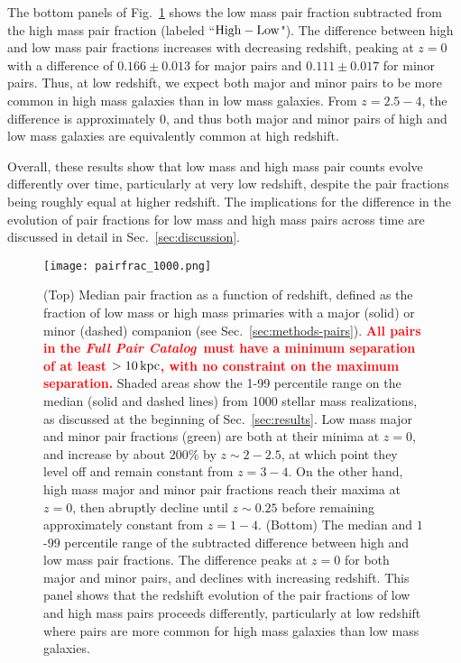 \documentclass[linenumbers,twocolumn]{aastex631}
\newcommand{\add}[1]{\textcolor{red}{\textbf{#1}}}
\newcommand{\paircat}{\textit{Full Pair Catalog}}
\begin{document}
    The bottom panels of Fig.~\ref{fig:pairfrac} shows the low mass pair fraction subtracted from the high mass pair fraction (labeled ``$\rm High-Low$").
    The difference between high and low mass pair fractions increases with decreasing redshift, peaking at $z=0$ with a difference of $0.166\pm0.013$ for major pairs and $0.111\pm0.017$ for minor pairs. 
    Thus, at low redshift, we expect both major and minor pairs to be more common in high mass galaxies than in low mass galaxies. 
    From $z=2.5-4$, the difference is approximately 0, and thus both major and minor pairs of high and low mass galaxies are equivalently common at high redshift. 
    
    Overall, these results show that low mass and high mass pair counts evolve differently over time, particularly at very low redshift, despite the pair fractions being roughly equal at higher redshift. 
    The implications for the difference in the evolution of pair fractions for low mass and high mass pairs across time are discussed in detail in Sec.~\ref{sec:discussion}.
    
    \begin{figure*}[htp]
      \centering
      \texttt{[image: pairfrac\_1000.png]}
      \caption{%
        (Top) Median pair fraction as a function of redshift, defined as the fraction of low mass or high mass primaries with a major (solid) or minor (dashed) companion  (see Sec.~\ref{sec:methods-pairs}). \add{All pairs in the \paircat\ must have a minimum separation of at least $>10\mathrm{\,kpc}$, with no constraint on the maximum separation.}
        Shaded areas show the 1-99 percentile range on the median (solid and dashed lines) from 1000 stellar mass realizations, as discussed at the beginning of Sec.~\ref{sec:results}. 
        Low mass major and minor pair fractions (green) are both at their minima at $z=0$, and increase by about 200\% by $z\sim2-2.5$, at which point they level off and remain constant from $z=3-4$. 
        On the other hand, high mass major and minor pair fractions reach their maxima at $z=0$, then abruptly decline until $z\sim0.25$ before remaining approximately constant from $z=1-4$. 
        (Bottom) The median and $1$-$99$ percentile range of the subtracted difference between high and low mass pair fractions. 
        The difference peaks at $z=0$ for both major and minor pairs, and declines with increasing redshift.
        This panel shows that the redshift evolution of the pair fractions of low and high mass pairs proceeds differently, particularly at low redshift where pairs are more common for high mass galaxies than low mass galaxies.}
      \label{fig:pairfrac}
    \end{figure*}
\end{document}
